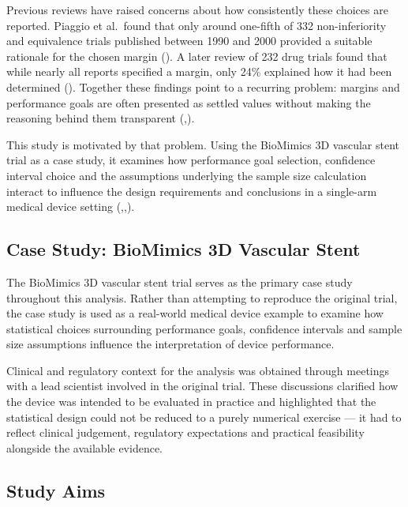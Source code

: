 \documentclass{article}
\begin{document}
Previous reviews have raised concerns about how consistently these
choices are reported. Piaggio et al.~found that only around one-fifth of
332 non-inferiority and equivalence trials published between 1990 and
2000 provided a suitable rationale for the chosen margin
(). A later review of 232 drug
trials found that while nearly all reports specified a margin, only 24\%
explained how it had been determined
(). Together these findings
point to a recurring problem: margins and performance goals are often
presented as settled values without making the reasoning behind them
transparent
(,).

This study is motivated by that problem. Using the BioMimics 3D vascular
stent trial as a case study, it examines how performance goal selection,
confidence interval choice and the assumptions underlying the sample
size calculation interact to influence the design requirements and
conclusions in a single-arm medical device setting
(,,).

\subsection{Case Study: BioMimics 3D Vascular
Stent}\label{case-study-biomimics-3d-vascular-stent}

The BioMimics 3D vascular stent trial serves as the primary case study
throughout this analysis. Rather than attempting to reproduce the
original trial, the case study is used as a real-world medical device
example to examine how statistical choices surrounding performance
goals, confidence intervals and sample size assumptions influence the
interpretation of device performance.

Clinical and regulatory context for the analysis was obtained through
meetings with a lead scientist involved in the original trial. These
discussions clarified how the device was intended to be evaluated in
practice and highlighted that the statistical design could not be
reduced to a purely numerical exercise --- it had to reflect clinical
judgement, regulatory expectations and practical feasibility alongside
the available evidence.

\subsection{Study Aims}\label{study-aims}
\end{document}
